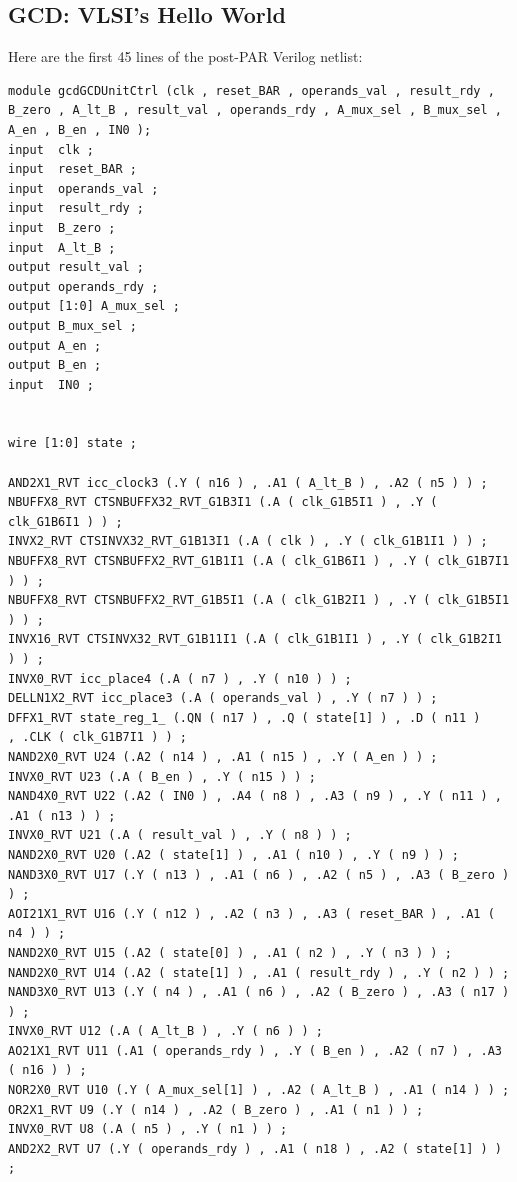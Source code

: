\documentclass[11pt]{article}
\begin{document}
\subsection{GCD: VLSI's Hello World}

Here are the first 45 lines of the post-PAR Verilog netlist:
\begin{verbatim}
module gcdGCDUnitCtrl (clk , reset_BAR , operands_val , result_rdy , 
B_zero , A_lt_B , result_val , operands_rdy , A_mux_sel , B_mux_sel , 
A_en , B_en , IN0 );
input  clk ;
input  reset_BAR ;
input  operands_val ;
input  result_rdy ;
input  B_zero ;
input  A_lt_B ;
output result_val ;
output operands_rdy ;
output [1:0] A_mux_sel ;
output B_mux_sel ;
output A_en ;
output B_en ;
input  IN0 ;


wire [1:0] state ;

AND2X1_RVT icc_clock3 (.Y ( n16 ) , .A1 ( A_lt_B ) , .A2 ( n5 ) ) ;
NBUFFX8_RVT CTSNBUFFX32_RVT_G1B3I1 (.A ( clk_G1B5I1 ) , .Y ( clk_G1B6I1 ) ) ;
INVX2_RVT CTSINVX32_RVT_G1B13I1 (.A ( clk ) , .Y ( clk_G1B1I1 ) ) ;
NBUFFX8_RVT CTSNBUFFX2_RVT_G1B1I1 (.A ( clk_G1B6I1 ) , .Y ( clk_G1B7I1 ) ) ;
NBUFFX8_RVT CTSNBUFFX2_RVT_G1B5I1 (.A ( clk_G1B2I1 ) , .Y ( clk_G1B5I1 ) ) ;
INVX16_RVT CTSINVX32_RVT_G1B11I1 (.A ( clk_G1B1I1 ) , .Y ( clk_G1B2I1 ) ) ;
INVX0_RVT icc_place4 (.A ( n7 ) , .Y ( n10 ) ) ;
DELLN1X2_RVT icc_place3 (.A ( operands_val ) , .Y ( n7 ) ) ;
DFFX1_RVT state_reg_1_ (.QN ( n17 ) , .Q ( state[1] ) , .D ( n11 ) 
, .CLK ( clk_G1B7I1 ) ) ;
NAND2X0_RVT U24 (.A2 ( n14 ) , .A1 ( n15 ) , .Y ( A_en ) ) ;
INVX0_RVT U23 (.A ( B_en ) , .Y ( n15 ) ) ;
NAND4X0_RVT U22 (.A2 ( IN0 ) , .A4 ( n8 ) , .A3 ( n9 ) , .Y ( n11 ) , .A1 ( n13 ) ) ;
INVX0_RVT U21 (.A ( result_val ) , .Y ( n8 ) ) ;
NAND2X0_RVT U20 (.A2 ( state[1] ) , .A1 ( n10 ) , .Y ( n9 ) ) ;
NAND3X0_RVT U17 (.Y ( n13 ) , .A1 ( n6 ) , .A2 ( n5 ) , .A3 ( B_zero ) ) ;
AOI21X1_RVT U16 (.Y ( n12 ) , .A2 ( n3 ) , .A3 ( reset_BAR ) , .A1 ( n4 ) ) ;
NAND2X0_RVT U15 (.A2 ( state[0] ) , .A1 ( n2 ) , .Y ( n3 ) ) ;
NAND2X0_RVT U14 (.A2 ( state[1] ) , .A1 ( result_rdy ) , .Y ( n2 ) ) ;
NAND3X0_RVT U13 (.Y ( n4 ) , .A1 ( n6 ) , .A2 ( B_zero ) , .A3 ( n17 ) ) ;
INVX0_RVT U12 (.A ( A_lt_B ) , .Y ( n6 ) ) ;
AO21X1_RVT U11 (.A1 ( operands_rdy ) , .Y ( B_en ) , .A2 ( n7 ) , .A3 ( n16 ) ) ;
NOR2X0_RVT U10 (.Y ( A_mux_sel[1] ) , .A2 ( A_lt_B ) , .A1 ( n14 ) ) ;
OR2X1_RVT U9 (.Y ( n14 ) , .A2 ( B_zero ) , .A1 ( n1 ) ) ;
INVX0_RVT U8 (.A ( n5 ) , .Y ( n1 ) ) ;
AND2X2_RVT U7 (.Y ( operands_rdy ) , .A1 ( n18 ) , .A2 ( state[1] ) ) ;
\end{verbatim}
\end{document}
